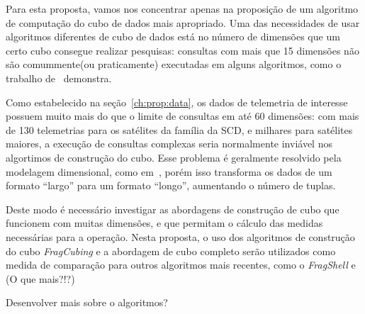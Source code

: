 {\color{red}
Para esta proposta, vamos nos concentrar apenas na proposição de um algoritmo de computação do cubo de dados mais apropriado.
Uma das necessidades de usar algoritmos diferentes de cubo de dados está no número de dimensões que um certo cubo consegue realizar pesquisas: consultas com mais que 15 dimensões não são comummente(ou praticamente) executadas em alguns algoritmos, como o trabalho de~\cite{silva:2015:abordagensParaCubo} demonstra.

Como estabelecido na seção~\ref{ch:prop:data}, os dados de telemetria de interesse possuem muito mais do que o limite de consultas em até 60 dimensões: com mais de 130 telemetrias para os satélites da família da SCD, e milhares para satélites maiores, a execução de consultas complexas seria normalmente inviável nos algortimos de construção do cubo.
Esse problema é geralmente resolvido pela modelagem dimensional, como em~\cite{AzevedoAmbr:2010:ArSaTe}, porém isso transforma os dados de um formato ``largo'' para um formato ``longo'', aumentando o número de tuplas.

Deste modo é necessário investigar as abordagens de construção de cubo que funcionem com muitas dimensões, e que permitam o cálculo das medidas necessárias para a operação.
Nesta proposta, o uso dos algoritmos de construção do cubo \textit{FragCubing} e a abordagem de cubo completo serão utilizados como medida de comparação para outros algoritmos mais recentes, como o \textit{FragShell} e
{\color{red} (O que mais?!?)}

{\color{red} Desenvolver mais sobre o algoritmos?}

}

